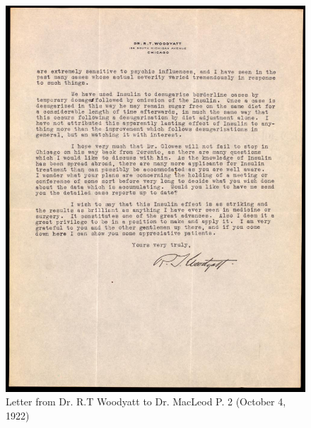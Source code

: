 \documentclass[12pt]{article}
\begin{document}
\begin{figure}[H]
\centering
  \includegraphics [width=5in]{mental_manp2}
  \caption{Letter from Dr. R.T Woodyatt to Dr. MacLeod P. 2 (October 4, 1922)}
  \label{fig: Letter from Dr. R. T. Woodyatt to Dr. MacLeod P. 2}
\end{figure}


\newpage
\singlespacing


\end{document}
